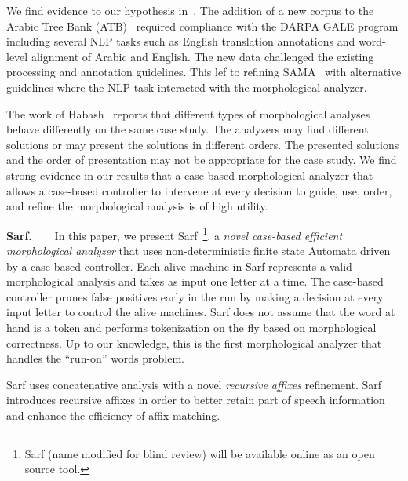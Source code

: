 \documentclass[11pt]{article}
\begin{document}
We find evidence to our hypothesis in~\cite{Maamouri:10}.
The addition of a new corpus to the Arabic Tree Bank 
(ATB)~\cite{Maamouri:04}
required compliance with the DARPA GALE program 
including several NLP tasks such as English translation 
annotations and word-level alignment of Arabic and English. 
The new data challenged the existing processing and 
annotation guidelines. 
This lef to refining 
SAMA~\cite{Kulick:10} with 
alternative guidelines where the NLP 
task interacted with the morphological analyzer. 

The work of Habash~ reports that different 
types of morphological analyses behave differently on the same case 
study. 
The analyzers may find different solutions or 
may present the solutions in different orders. 
The presented solutions and the order of presentation may not be 
appropriate for the case study. 
We find strong evidence in our results 
that a case-based morphological analyzer that allows a case-based 
controller to intervene at every decision to guide, use, order, and 
refine the morphological analysis is of high utility.


{\bf Sarf.~~~}
In this paper, we present Sarf~\footnote{Sarf (name modified for blind review) 
will be available online as an open source tool.},
 a {\em novel case-based efficient
morphological analyzer} that uses 
non-deterministic finite state Automata 
driven by a case-based controller.
Each alive machine in Sarf represents a valid morphological analysis
and takes as input one letter at a time.
The case-based controller prunes false positives
early in the run by making a decision at every input letter
to control the alive machines.
Sarf does not assume that the word at hand is a token and
performs tokenization on the fly based on morphological correctness.
Up to our knowledge, this is the first morphological analyzer that 
handles the ``run-on'' words problem. 

Sarf uses concatenative analysis with a novel 
{\em recursive affixes} refinement. 
Sarf introduces recursive affixes in order to
better retain part of speech information and enhance the 
efficiency of affix matching. 


\transfalse
\begin{figure}[tb]
\end{figure}
\transtrue
\end{document}
